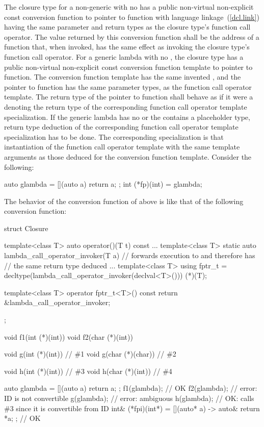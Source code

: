 \pnum
The closure type for a non-generic  with no
has a public non-virtual non-explicit const conversion function to pointer to
function with \Cpp language linkage~(\ref{dcl.link}) having
the same parameter and return types as the closure type's function call operator. The
value returned by this conversion function shall be the address of a function that, when
invoked, has the same effect as invoking the closure type's function call operator.
For a generic lambda with no , the closure type has a
public non-virtual non-explicit const conversion function template to
pointer to function. The conversion function template has the same invented
, and the pointer to function has the same
parameter types, as the function call operator template.  The return type of
the pointer to function shall behave as if it were a
 denoting the return type of the corresponding
function call operator template specialization.
\enternote If the generic lambda has no  or
the  contains a placeholder type, return type
deduction of the corresponding function call operator template specialization
has to be done. The corresponding specialization is that instantiation of the
function call operator template with the same template arguments as those
deduced for the conversion function template.  Consider the following:
\begin{codeblock}
auto glambda = [](auto a) { return a; };
int (*fp)(int) = glambda;
\end{codeblock}
The behavior of the conversion function of  above is like
that of the following conversion function:
\begin{codeblock}
struct Closure {
  template<class T> auto operator()(T t) const { ... }
  template<class T> static auto lambda_call_operator_invoker(T a) {
    // forwards execution to  and therefore has
    // the same return type deduced
    ...
  }
  template<class T> using fptr_t =
     decltype(lambda_call_operator_invoker(declval<T>())) (*)(T);

  template<class T> operator fptr_t<T>() const
    { return &lambda_call_operator_invoker; }
};
\end{codeblock}
\exitnote
\enterexample
\begin{codeblock}
void f1(int (*)(int))   { }
void f2(char (*)(int))  { }

void g(int (*)(int))    { }  // \#1
void g(char (*)(char))  { }  // \#2

void h(int (*)(int))    { }  // \#3
void h(char (*)(int))   { }  // \#4

auto glambda = [](auto a) { return a; };
f1(glambda);  // OK
f2(glambda);  // error: ID is not convertible
g(glambda);   // error: ambiguous
h(glambda);   // OK: calls \#3 since it is convertible from ID
int& (*fpi)(int*) = [](auto* a) -> auto& { return *a; }; // OK
\end{codeblock}
